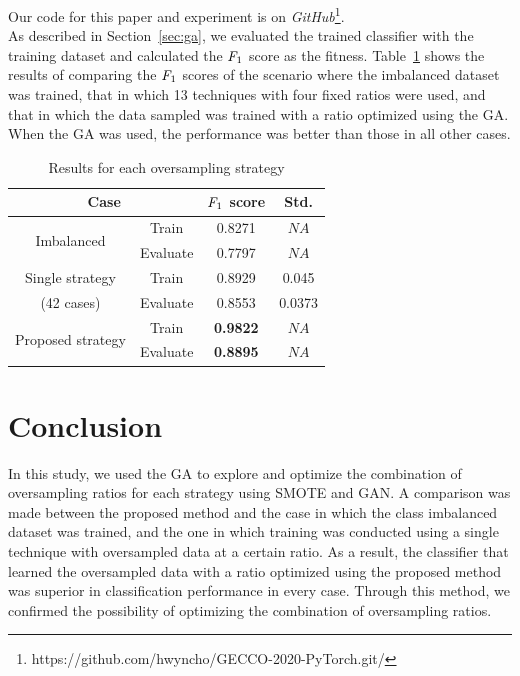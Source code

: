 Our code for this paper and experiment is on \emph{GitHub}\footnote{https://github.com/hwyncho/GECCO-2020-PyTorch.git/}.\\
As described in Section~\ref{sec:ga}, we evaluated the trained classifier with the training dataset and calculated the $\emph{F}_{1}$ score as the fitness.
Table~\ref{tab:1} shows the results of comparing the $\emph{F}_{1}$ scores of the scenario where the imbalanced dataset was trained, that in which 13 techniques with four fixed ratios were used, and that in which the data sampled was trained with a ratio optimized using the GA.
When the GA was used, the performance was better than those in all other cases.

\begin{table}[t]
    \centering
    \caption{Results for each oversampling strategy}
    \begin{tabular}{c|c|c|c}
        \toprule
        \multicolumn{2}{c|}{\textbf{Case}} & \textbf{$\emph{F}_{1}$ score} & \textbf{Std.} \\
        \hline
        \multirow{2}{*}{Imbalanced} & Train & 0.8271 & $NA$ \\
        & Evaluate & 0.7797 & $NA$ \\
        \hline
        Single strategy & Train & 0.8929 & 0.045 \\
        (42 cases) & Evaluate & 0.8553 & 0.0373 \\
        \hline
        \multirow{2}{*}{Proposed strategy} & Train & \textbf{0.9822} & $NA$ \\
        & Evaluate & \textbf{0.8895} & $NA$ \\
        \bottomrule
    \end{tabular}
    \label{tab:1}
\end{table}


\section{Conclusion}
\label{sec:conclusion}
In this study, we used the GA to explore and optimize the combination of oversampling ratios for each strategy using SMOTE and GAN.
A comparison was made between the proposed method and the case in which the class imbalanced dataset was trained, and the one in which training was conducted using a single technique with oversampled data at a certain ratio.
As a result, the classifier that learned the oversampled data with a ratio optimized using the proposed method was superior in classification performance in every case.
Through this method, we confirmed the possibility of optimizing the combination of oversampling ratios.